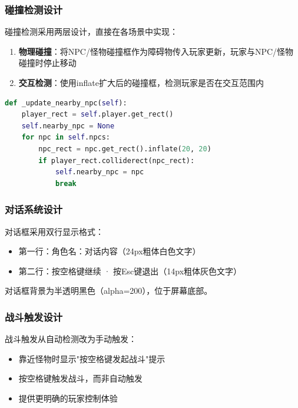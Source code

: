 \documentclass[12pt,a4paper]{article}
\begin{document}
\subsubsection{碰撞检测设计}

碰撞检测采用两层设计，直接在各场景中实现：

\begin{enumerate}[label=\arabic*.]
    \item \textbf{物理碰撞}：将NPC/怪物碰撞框作为障碍物传入玩家更新，玩家与NPC/怪物碰撞时停止移动
    \item \textbf{交互检测}：使用inflate扩大后的碰撞框，检测玩家是否在交互范围内
\end{enumerate}

\begin{lstlisting}[language=Python,caption={NPC交互检测代码}]
def _update_nearby_npc(self):
    player_rect = self.player.get_rect()
    self.nearby_npc = None
    for npc in self.npcs:
        npc_rect = npc.get_rect().inflate(20, 20)
        if player_rect.colliderect(npc_rect):
            self.nearby_npc = npc
            break
\end{lstlisting}

\subsubsection{对话系统设计}

对话框采用双行显示格式：
\begin{itemize}
    \item 第一行：角色名：对话内容（24px粗体白色文字）
    \item 第二行：按空格键继续 · 按Esc键退出（14px粗体灰色文字）
\end{itemize}

对话框背景为半透明黑色（alpha=200），位于屏幕底部。

\subsubsection{战斗触发设计}

战斗触发从自动检测改为手动触发：
\begin{itemize}
    \item 靠近怪物时显示"按空格键发起战斗"提示
    \item 按空格键触发战斗，而非自动触发
    \item 提供更明确的玩家控制体验
\end{itemize}

\end{document}
